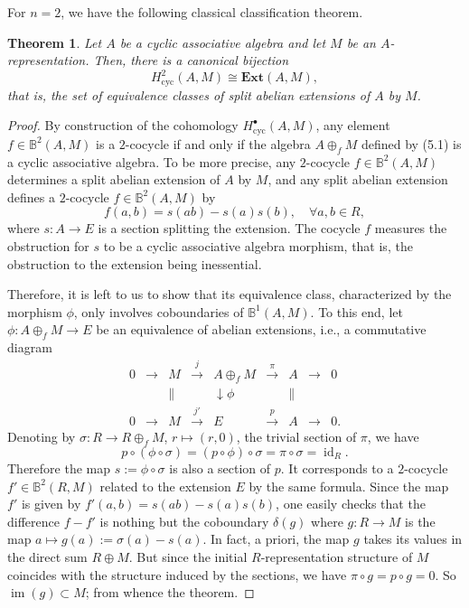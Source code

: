 \documentclass[pdflatex,sn-mathphys-num]{sn-jnl}%
\theoremstyle{thmstyleone}%
\newtheorem{theorem}{Theorem}%
\theoremstyle{thmstyletwo}%
\theoremstyle{thmstylethree}%
\begin{document}
For $n = 2$, we have the following classical classification theorem.

\begin{theorem}\label{thm:classification}
Let $A$ be a cyclic associative algebra and let $M$ be an $A$-representation. Then, there is a canonical bijection
\[
H^2_{\mathrm{cyc}}(A, M) \cong \mathbf{Ext}(A, M),
\]
that is, the set of equivalence classes of split abelian extensions of $A$ by $M$.
\end{theorem}

\begin{proof}
By construction of the cohomology $H^\bullet_{\mathrm{cyc}}(A, M)$, any element $f \in \mathbb{B}^2(A, M)$ is a $2$-cocycle if and only if the algebra $A \oplus_f M$ defined by (5.1) is a cyclic associative algebra. To be more precise, any $2$-cocycle $f \in \mathbb{B}^2(A, M)$ determines a split abelian extension of $A$ by $M$, and any split abelian extension defines a $2$-cocycle $f \in \mathbb{B}^2(A, M)$ by
\[
f(a, b) = s(ab) - s(a) s(b), \quad \forall a, b \in R,
\]
where $s: A \to E$ is a section splitting the extension. The cocycle $f$ measures the obstruction for $s$ to be a cyclic associative algebra morphism, that is, the obstruction to the extension being inessential.

Therefore, it is left to us to show that its equivalence class, characterized by the morphism $\phi$, only involves coboundaries of $\mathbb{B}^1(A, M)$. To this end, let $\phi: A \oplus_f M \to E$ be an equivalence of abelian extensions, i.e., a commutative diagram
\[
\begin{array}{ccccccccc}
0 & \longrightarrow & M & \xrightarrow{j} & A \oplus_f M & \xrightarrow{\pi} & A & \longrightarrow & 0 \\
& & \| & & \downarrow{\phi} & & \| & & \\
0 & \longrightarrow & M & \xrightarrow{j'} & E & \xrightarrow{p} & A & \longrightarrow & 0.
\end{array}
\]
Denoting by $\sigma: R \to R \oplus_f M$, $r \mapsto (r, 0)$, the trivial section of $\pi$, we have
\[
p \circ (\phi \circ \sigma) = (p \circ \phi) \circ \sigma = \pi \circ \sigma = \operatorname{id}_R.
\]
Therefore the map $s := \phi \circ \sigma$ is also a section of $p$. It corresponds to a $2$-cocycle $f' \in \mathbb{B}^2(R, M)$ related to the extension $E$ by the same formula. Since the map $f'$ is given by $f'(a, b) = s(ab) - s(a) s(b)$, one easily checks that the difference $f - f'$ is nothing but the coboundary $\delta(g)$ where $g: R \to M$ is the map $a \mapsto g(a) := \sigma(a) - s(a)$. In fact, a priori, the map $g$ takes its values in the direct sum $R \oplus M$. But since the initial $R$-representation structure of $M$ coincides with the structure induced by the sections, we have $\pi \circ g = p \circ g = 0$. So $\operatorname{im}(g) \subset M$; from whence the theorem. 
\end{proof}
\end{document}
